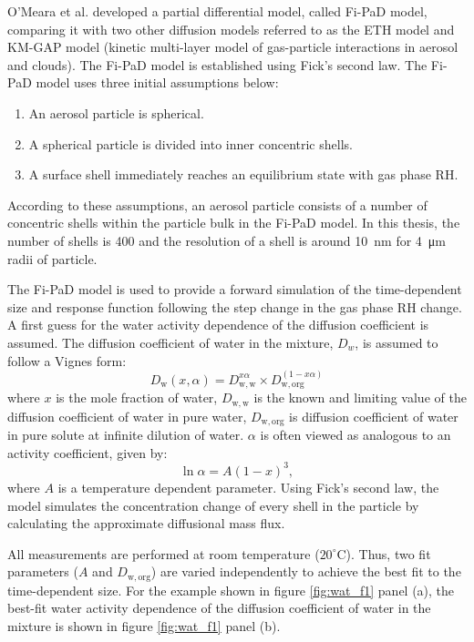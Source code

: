 O’Meara et al. developed a partial differential model, called Fi-PaD model, comparing it with two other diffusion models referred to as the ETH model and KM-GAP model (kinetic multi-layer model of gas-particle interactions in aerosol and clouds)\cite{omearaRateEquilibrationViscous2016}. The Fi-PaD model is established using Fick’s second law. The Fi-PaD model uses three initial assumptions below:
\begin{enumerate}
    \item An aerosol particle is spherical.
    \item A spherical particle is divided into inner concentric shells.
    \item A surface shell immediately reaches an equilibrium state with gas phase RH.
\end{enumerate}
According to these assumptions, an aerosol particle consists of a number of concentric shells within the particle bulk in the Fi-PaD model. In this thesis, the number of shells is \num{400} and the resolution of a shell is around \SI{10}{\nano\meter} for \SI{4}{\micro\meter} radii of particle. 

The Fi-PaD model is used to provide a forward simulation of the time-dependent size and response function following the step change in the gas phase RH change\cite{omearaRateEquilibrationViscous2016,Ingram2017}. A first guess for the water activity dependence of the diffusion coefficient is assumed. The diffusion coefficient of water in the mixture, $D_{w}$, is assumed to follow a Vignes form\cite{omearaRateEquilibrationViscous2016,Ingram2017}:
\begin{equation}\label{eqn:vignes_form}
D_{\mathrm{w}}(x, \alpha)=D_{\mathrm{w, w}}^{x \alpha} \times D_{\mathrm{w}, \mathrm{org}}^{(1-x \alpha)}
\end{equation}
where $x$ is the mole fraction of water, $D_{\mathrm{w, w}}$ is the known and limiting value of the diffusion coefficient of water in pure water, $D_{\mathrm{w}, \mathrm{org}}$ is diffusion coefficient of water in pure solute at infinite dilution of water. $\alpha$ is often viewed as analogous to an activity coefficient, given by:
\begin{equation}
\ln \alpha=A(1-x)^{3},
\end{equation}
where $A$ is a temperature dependent parameter. Using Fick’s second law, the model simulates the concentration change of every shell in the particle by calculating the approximate diffusional mass flux.  

All measurements are performed at room temperature ($\num{20}^{\circ}\mathrm{C}$). Thus, two fit parameters ($A$ and $D_{\mathrm{w,org}}$) are varied independently to achieve the best fit to the time-dependent size. For the example shown in figure \ref{fig:wat_f1} panel (a), the best-fit water activity dependence of the diffusion coefficient of water in the mixture is shown in figure \ref{fig:wat_f1} panel (b). 

